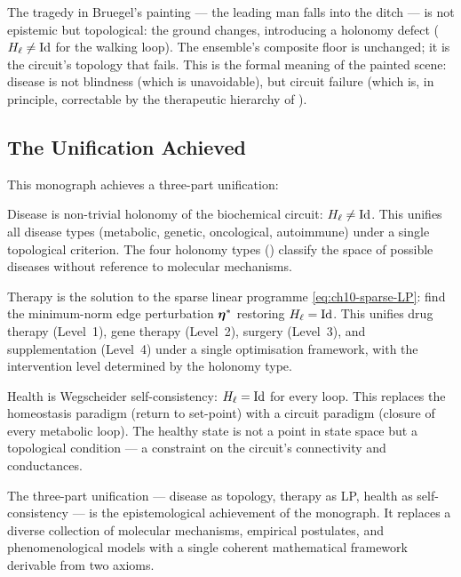 The tragedy in Bruegel's painting — the leading man falls into the ditch —
is not epistemic but topological: the ground changes, introducing a holonomy
defect ($H_\ell \neq \mathrm{Id}$ for the walking loop).  The ensemble's
composite floor is unchanged; it is the circuit's topology that fails.
This is the formal meaning of the painted scene: disease is not blindness
(which is unavoidable), but circuit failure (which is, in principle, correctable
by the therapeutic hierarchy of ).

\subsection{The Unification Achieved}

This monograph achieves a three-part unification:

\begin{description}[leftmargin=2em, style=nextline]
  \item[Disease as topology.]
    Disease is non-trivial holonomy of the biochemical circuit: $H_\ell \neq
    \mathrm{Id}$.  This unifies all disease types (metabolic, genetic,
    oncological, autoimmune) under a single topological criterion.  The four
    holonomy types () classify the space of possible
    diseases without reference to molecular mechanisms.

  \item[Therapy as LP.]
    Therapy is the solution to the sparse linear programme \eqref{eq:ch10-sparse-LP}:
    find the minimum-norm edge perturbation $\boldsymbol{\eta}^*$ restoring $H_\ell =
    \mathrm{Id}$.  This unifies drug therapy (Level~1), gene therapy (Level~2),
    surgery (Level~3), and supplementation (Level~4) under a single
    optimisation framework, with the intervention level determined by the
    holonomy type.

  \item[Health as self-consistency.]
    Health is Wegscheider self-consistency: $H_\ell = \mathrm{Id}$ for every
    loop.  This replaces the homeostasis paradigm (return to set-point) with
    a circuit paradigm (closure of every metabolic loop).  The healthy state
    is not a point in state space but a topological condition — a constraint
    on the circuit's connectivity and conductances.
\end{description}

The three-part unification — disease as topology, therapy as LP, health as
self-consistency — is the epistemological achievement of the monograph.  It
replaces a diverse collection of molecular mechanisms, empirical postulates,
and phenomenological models with a single coherent mathematical framework
derivable from two axioms.

